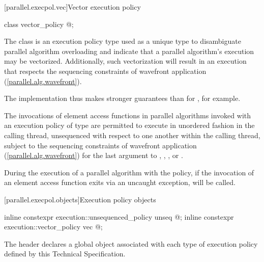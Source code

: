 [parallel.execpol.vec]{Vector execution policy}

\begin{codeblock}
class vector_policy { @\unspec@ };
\end{codeblock}

\pnum
The class  is an execution policy type used as a
unique type to disambiguate parallel algorithm overloading and indicate that a
parallel algorithm's execution may be vectorized. Additionally, such
vectorization will result in an execution that respects the sequencing
constraints of wavefront application
(\ref{parallel.alg.wavefront}).
\begin{note}The implementation thus makes stronger guarantees than for
, for example.\end{note}

\pnum
The invocations of element access functions in parallel algorithms
invoked with an execution policy of type  are permitted to
execute in unordered fashion in the calling thread, unsequenced with respect to
one another within the calling thread, subject to the sequencing constraints of
wavefront application
(\ref{parallel.alg.wavefront})
for the last argument to , ,
, or .

\pnum
During the execution of a parallel algorithm with the
 policy, if the invocation of an
element access function exits via an uncaught exception, 
will be called.

[parallel.execpol.objects]{Execution policy objects}

\begin{codeblock}
inline constexpr execution::unsequenced_policy unseq{ @\unspec@ };
inline constexpr execution::vector_policy vec{ @\unspec@ };
\end{codeblock}

\pnum
The header  declares a global object
associated with each type of execution policy defined by this Technical
Specification.

